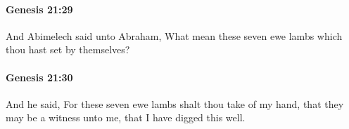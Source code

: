 		\paragraph{Genesis 21:29} %
			\label{GENESIS-21-29}

			And Abimelech said unto Abraham, What mean these seven ewe lambs which thou hast set by themselves?


		\paragraph{Genesis 21:30} %
			\label{GENESIS-21-30}

			And he said, For these seven ewe lambs shalt thou take of my hand, that they may be a witness unto me, that I have digged this well.


